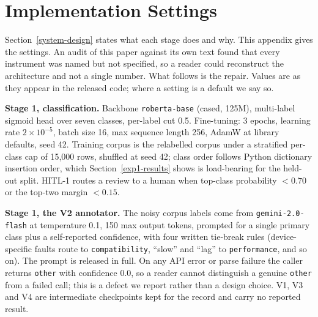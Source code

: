 \documentclass[preprint,12pt]{elsarticle}
\begin{document}


\appendix
  
  \section{Implementation Settings}\label{appendix:settings}

  Section~\ref{system-design} states what each stage does and why. This appendix gives the
  settings. An audit of this paper against its own text found that every instrument was named but
  not specified, so a reader could reconstruct the architecture and not a single number. What
  follows is the repair. Values are as they appear in the released code; where a setting is a
  default we say so.

  \textbf{Stage 1, classification.} Backbone \texttt{roberta-base} (cased, 125M), multi-label
  sigmoid head over seven classes, per-label cut 0.5. Fine-tuning: 3 epochs, learning rate
  $2\times10^{-5}$, batch size 16, max sequence length 256, AdamW at library defaults, seed 42.
  Training corpus is the relabelled corpus under a stratified per-class cap of 15{,}000 rows,
  shuffled at seed 42; class order follows Python dictionary insertion order, which
  Section~\ref{exp1-results} shows is load-bearing for the held-out split. HITL-1 routes a review
  to a human when top-class probability $< 0.70$ or the top-two margin $< 0.15$.

  \textbf{Stage 1, the V2 annotator.} The noisy corpus labels come from
  \texttt{gemini-2.0-flash} at temperature 0.1, 150 max output tokens, prompted for a single
  primary class plus a self-reported confidence, with four written tie-break rules (device-specific
  faults route to \texttt{compatibility}, ``slow'' and ``lag'' to \texttt{performance}, and so on).
  The prompt is released in full. On any API error or parse failure the caller returns
  \texttt{other} with confidence 0.0, so a reader cannot distinguish a genuine \texttt{other} from
  a failed call; this is a defect we report rather than a design choice. V1, V3 and V4 are
  intermediate checkpoints kept for the record and carry no reported result.
\end{document}
